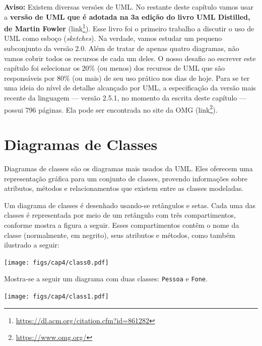 \documentclass[
  11pt,
  twoside]{book}
\newcommand{\passthrough}[1]{#1}
\DeclareRobustCommand{\href}[2]{#2\footnote{\url{#1}}}
\newenvironment{aviso}{\centering \vspace{1.5ex} \begin{tcolorbox}[breakable, colback=backcolor, width=4.9in]}{\end{tcolorbox} \vspace{1.5ex}}
\begin{document}
\begin{aviso}

 \textbf{Aviso:} Existem diversas versões de UML.
No restante deste capítulo vamos usar a \textbf{versão de UML que é
adotada na 3a edição do livro UML Distilled, de Martin Fowler}
(\href{https://dl.acm.org/citation.cfm?id=861282}{link}). Esse livro foi
o primeiro trabalho a discutir o uso de UML como esboço
(\emph{sketches}). Na verdade, vamos estudar um pequeno subconjunto da
versão 2.0. Além de tratar de apenas quatro diagramas, não vamos cobrir
todos os recursos de cada um deles. O nosso desafio ao escrever este
capítulo foi selecionar os 20\% (ou menos) dos recursos de UML que são
responsáveis por 80\% (ou mais) de seu uso prático nos dias de hoje.
Para se ter uma ideia do nível de detalhe alcançado por UML, a
especificação da versão mais recente da linguagem --- versão 2.5.1, no
momento da escrita deste capítulo --- possui 796 páginas. Ela pode ser
encontrada no site da OMG (\href{https://www.omg.org/}{link}).

\end{aviso}

\hypertarget{diagramas-de-classes}{%
\section{Diagramas de Classes}\label{diagramas-de-classes}}

 

Diagramas de classes são os diagramas mais usados da UML. Eles oferecem
uma representação gráfica para um conjunto de classes, provendo
informações sobre atributos, métodos e relacionamentos que existem entre
as classes modeladas.

Um diagrama de classes é desenhado usando-se retângulos e setas. Cada
uma das classes é representada por meio de um retângulo com três
compartimentos, conforme mostra a figura a seguir. Esses compartimentos
contêm o nome da classe (normalmente, em negrito), seus atributos e
métodos, como também ilustrado a seguir:

\texttt{[image: figs/cap4/class0.pdf]}

Mostra-se a seguir um diagrama com duas classes:
\passthrough{\lstinline!Pessoa!} e \passthrough{\lstinline!Fone!}.

\texttt{[image: figs/cap4/class1.pdf]}
\end{document}
